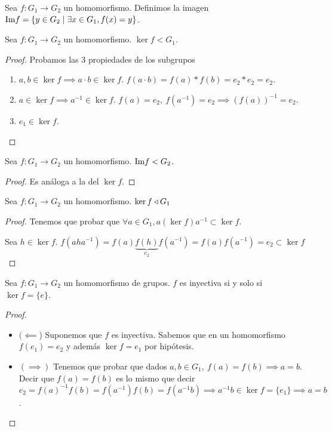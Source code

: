 \begin{dfn}
	Sea $f:G_1 \to G_2$ un homomorfismo. Definimos la imagen $\text{Im} f = \{y \in G_2 \mid \exists x \in G_1, f(x) = y\}$.
\end{dfn}

\begin{pro}Sea $f: G_1 \to G_2$ un homomorfismo. $\ker f < G_1$.
\end{pro}

\begin{proof} Probamos las 3 propiedades de los subgrupos
	\begin{enumerate}
		\item $a,b \in \ker f \implies a \cdot b \in \ker f$. $f(a \cdot b) = f(a) \ast f(b) = e_2 \ast e_2 = e_2$.
		\item $a \in \ker f \implies a^{-1} \in \ker f$. $f(a) = e_2,\ f(a^{-1}) = e_2 \implies (f(a))^{-1} = e_2$.
		\item $e_1 \in \ker f$.
	\end{enumerate}
\end{proof}

\begin{thm}
	Sea $f: G_1 \to G_2$ un homomorfismo. $\text{Im} f < G_2$.
\end{thm}

\begin{proof} Es análoga a la del $\ker f$.\end{proof}

\begin{thm}
	Sea $f : G_1 \to G_2$ un homomorfismo. $\ker f \mathbin{\triangleleft} G_1$
\end{thm}

\begin{proof}
	Tenemos que probar que $\forall a \in G_1, a (\ker f) a^{-1} \subset \ker f$.
	
	Sea $h \in \ker f$. $f(a h a^{-1}) = f(a)\underbrace{f(h)}_{e_2}f(a^{-1}) = f(a)f(a^{-1}) = e_2\subset \ker f$
\end{proof}

\begin{pro}
	Sea $f:G_1 \to G_2$ un homomorfismo de grupos. $f$ es inyectiva si y solo si $\ker f = \{e\}$.
\end{pro}

\begin{proof}$ $ \newline
	\begin{itemize}
		\item $(\impliedby$) Suponemos que $f$ es inyectiva. Sabemos que en un homomorfismo $f(e_1) = e_2$ y además $\ker f = {e_1}$ por hipótesis.
		\item $(\implies)$ Tenemos que probar que dados $a,b \in G_1,\ f(a) = f(b) \implies a = b$. Decir que $f(a) = f(b)$ es lo mismo que decir $e_2 = f(a)^{-1}f(b) = f(a^{-1}) f(b) = f(a^{-1}b) \implies a^{-1}b \in \ker f = \{e_1\} \implies a = b$.
	\end{itemize}
\end{proof}

